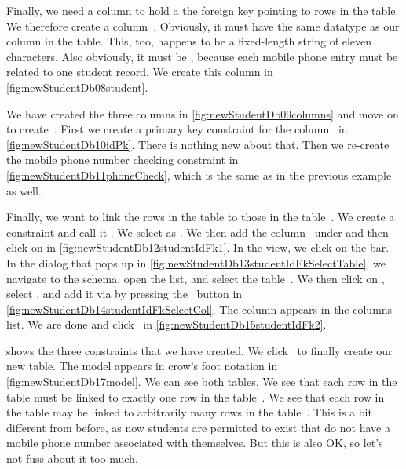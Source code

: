Finally, we need a column to hold a the foreign key  pointing to rows in the  table.
We therefore create a column~.
Obviously, it must have the same datatype as our  column in the  table.
This, too, happens to be a fixed-length string of eleven characters.
Also obviously, it must be , because each mobile phone entry must be related to one student record.
We create this column in \cref{fig:newStudentDb08student}.

We have created the three columns in \cref{fig:newStudentDb09columns} and move on to create~.
First we create a primary key constraint for the column~ in \cref{fig:newStudentDb10idPk}.
There is nothing new about that.
Then we re-create the mobile phone number checking constraint in \cref{fig:newStudentDb11phoneCheck}, which is the same as in the previous example as well.

Finally, we want to link the rows in the table  to those in the table~.
We create a  constraint and call it .
We select  as .
We then add the column~ under  and then click on  in \cref{fig:newStudentDb12studentIdFk1}.
In the  view, we click on the  bar.
In the dialog that pops up in \cref{fig:newStudentDb13studentIdFkSelectTable}, we navigate to the  schema, open the  list, and select the table~.
We then click on , select , and add it via by pressing the
~\pgmodelerAddItem button in \cref{fig:newStudentDb14studentIdFkSelectCol}.
The  column appears in the columns list.
We are done and click~ in \cref{fig:newStudentDb15studentIdFk2}.

 shows the three constraints that we have created.
We click~ to finally create our new table.
The model appears in crow's foot notation in \cref{fig:newStudentDb17model}.
We can see both tables.
We see that each row in the table  must be linked to exactly one row in the table~.
We see that each row in the table  may be linked to arbitrarily many rows in the table~.
This is a bit different from before, as now students are permitted to exist that do not have a mobile phone number associated with themselves.
But this is also OK, so let's not fuss about it too much.

